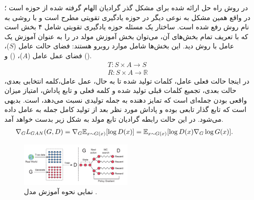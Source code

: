 \subsubsection*{}
در روش  راه حل ارائه شده برای مشکل گذر گرادیان الهام گرفته شده از حوزه  است \cite{seqgan}؛ در واقع همین مشکل به نوعی دیگر در حوزه یادگیری تقویتی مطرح است و با روشی به نام روش  رفع شده است. ساختار یک مسئله حوزه یادگیری تقویتی شامل ۴ بخش است که با تعریف تمام بخش‌های آن، ‌می‌توان بخش آموزش مولد در \gan{} را به عنوان آموزش یک عامل با روش \reinforce{} دید. این بخش‌ها شامل موارد روبرو هستند: فضای حالت عامل ($S$)، فضای عمل عامل ($A$)، 
()
و 
().
\begin{equation}\begin{split}
		\nonumber
		T: S \times A \rightarrow S\\
		R: S \times A \rightarrow \mathbb{R}
	\end{split}\end{equation}
در اینجا حالت فعلی عامل،  کلمات تولید شده تا به حال، عمل عامل،‌کلمه انتخابی بعدی، حالت بعدی، تجمیع کلمات قبلی تولید شده و کلمه فعلی و تابع پاداش، امتیاز میزان واقعی بودن جمله‌ای است که تمایز دهنده به جمله تولیدی نسبت می‌دهد، است. بدیهی است که تابع گذار تابعی  بوده و پاداش مورد نظر بعد از تولید کامل جمله به عامل داده می‌شود. در این حالت رابطه گرادیان تابع مولد به شکل زیر بدست خواهد آمد.
\begin{equation} \label{eq:seqgan-grad}
	\begin{split}
		\nabla_G L_{GAN} (G, D) &= \nabla_G \expected_{x \sim G(x)} [\log D(x)]= \expected_{x \sim G(x)} [\log D(x) \nabla_G \log G(x)].
	\end{split}
\end{equation}

\begin{figure}[t]
	\centering
	\includegraphics[width=0.5\textwidth]{images/seq-gan.png}
	\caption{
		نمایی نحوه آموزش مدل 
		\cite{seqgan}.}
	\label{fig:seq-gan}
\end{figure}

